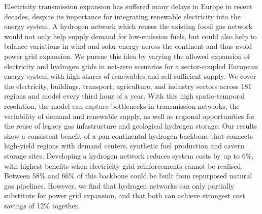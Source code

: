 Electricity transmission expansion has suffered many delays in Europe in recent
decades, despite its importance for integrating renewable electricity into the
energy system. A hydrogen network which reuses the existing fossil gas network
would not only help supply demand for low-emission fuels, but could also help to
balance variations in wind and solar energy across the continent and thus avoid
power grid expansion. We pursue this idea by varying the allowed expansion of
electricity and hydrogen grids in net-zero \co scenarios for a sector-coupled
European energy system with high shares of renewables and self-sufficient
supply. We cover the electricity, buildings, transport, agriculture, and
industry sectors across 181 regions and model every third hour of a year. With
this high spatio-temporal resolution, the model can capture bottlenecks in
transmission networks, the variability of demand and renewable supply, as well
as regional opportunities for the reuse of legacy gas infastructure and
geological hydrogen storage. Our results show a consistent benefit of a
pan-continental hydrogen backbone that connects high-yield regions with demand
centers, synthetic fuel production and cavern storage sites. Developing a
hydrogen network reduces system costs by up to 6\%, with highest benefits when
electricity grid reinforcements cannot be realised. Between 58\% and 66\% of
this backbone could be built from repurposed natural gas pipelines. However, we
find that hydrogen networks can only partially substitute for power grid
expansion, and that both can achieve strongest cost savings of 12\% together.